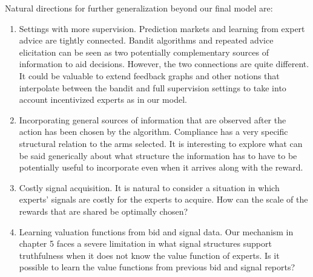 Natural directions for further generalization beyond our final model are:

\begin{enumerate}

\item Settings with more supervision. Prediction markets and learning from expert advice are tightly connected. Bandit algorithms and repeated advice elicitation can be seen as two potentially complementary sources of information to aid decisions. However, the two connections are quite different. It could be valuable to extend feedback graphs and other notions that interpolate between the bandit and full supervision settings to take into account incentivized experts as in our model. 

\item Incorporating general sources of information that are observed after the action has been chosen by the algorithm. Compliance has a very specific structural relation to the arms selected. It is interesting to explore what can be said generically about what structure the information has to have to be potentially useful to incorporate even when it arrives along with the reward.

\item Costly signal acquisition. It is natural to consider a situation in which experts' signals are costly for the experts to acquire. How can the scale of the rewards that are shared be optimally chosen?

\item Learning valuation functions from bid and signal data. Our mechanism in chapter 5 faces a severe limitation in what signal structures support truthfulness when it does not know the value function of experts. Is it possible to learn the value functions from previous bid and signal reports?

\end{enumerate}





